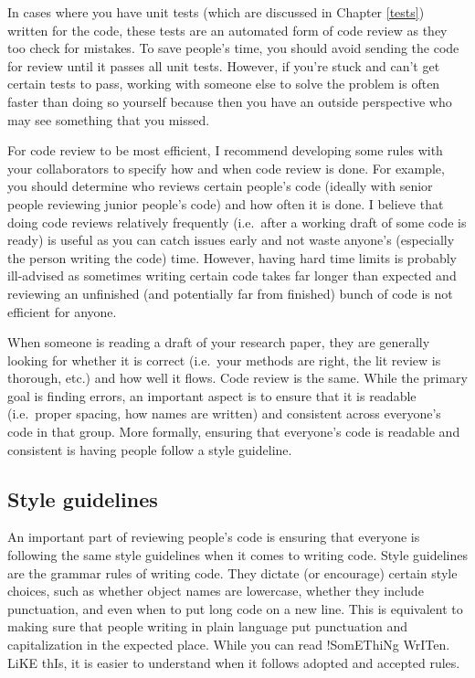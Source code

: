 \documentclass[
  a4paper,
]{krantz}
\begin{document}
In cases where you have unit tests (which are discussed in
Chapter \ref{tests}) written for the code, these tests are
an automated form of code review as they too check for
mistakes. To save people's time, you should avoid sending
the code for review until it passes all unit tests. However,
if you're stuck and can't get certain tests to pass, working
with someone else to solve the problem is often faster than
doing so yourself because then you have an outside
perspective who may see something that you missed.

For code review to be most efficient, I recommend developing
some rules with your collaborators to specify how and when
code review is done. For example, you should determine who
reviews certain people's code (ideally with senior people
reviewing junior people's code) and how often it is done. I
believe that doing code reviews relatively frequently
(i.e.~after a working draft of some code is ready) is useful
as you can catch issues early and not waste anyone's
(especially the person writing the code) time. However,
having hard time limits is probably ill-advised as sometimes
writing certain code takes far longer than expected and
reviewing an unfinished (and potentially far from finished)
bunch of code is not efficient for anyone.

When someone is reading a draft of your research paper, they
are generally looking for whether it is correct (i.e.~your
methods are right, the lit review is thorough, etc.) and how
well it flows. Code review is the same. While the primary
goal is finding errors, an important aspect is to ensure
that it is readable (i.e.~proper spacing, how names are
written) and consistent across everyone's code in that
group. More formally, ensuring that everyone's code is
readable and consistent is having people follow a style
guideline.

\hypertarget{style-guidelines}{%
\subsection{Style guidelines}\label{style-guidelines}}

An important part of reviewing people's code is ensuring
that everyone is following the same style guidelines when it
comes to writing code. Style guidelines are the grammar
rules of writing code. They dictate (or encourage) certain
style choices, such as whether object names are lowercase,
whether they include punctuation, and even when to put long
code on a new line. This is equivalent to making sure that
people writing in plain language put punctuation and
capitalization in the expected place. While you can read
!SomEThiNg WrITen. LiKE thIs, it is easier to understand
when it follows adopted and accepted rules.
\end{document}
